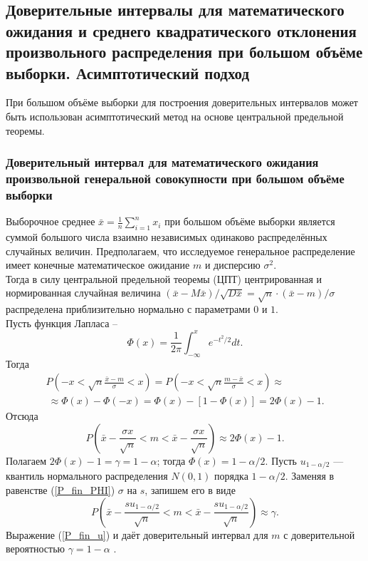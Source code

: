 \documentclass[../body.tex]{subfiles}
\begin{document}
	\subsection{Доверительные интервалы для математического ожидания и среднего квадратического отклонения произвольного распределения при большом объёме выборки. Асимптотический подход}
	При большом объёме выборки для построения доверительных интервалов может быть использован асимптотический метод на основе центральной предельной теоремы.
	\subsubsection{Доверительный интервал для математического ожидания произвольной генеральной совокупности при большом объёме выборки}
	Выборочное среднее $\bar{x} = \frac{1}{n}\sum_{i = 1}^{n}{x_{i}}$ при большом объёме выборки является суммой большого числа взаимно независимых одинаково распределённых случайных величин. Предполагаем, что исследуемое генеральное распределение имеет конечные математическое ожидание $m$ и дисперсию $\sigma^{2}$.\\ Тогда в силу центральной предельной теоремы (ЦПТ) центрированная и нормированная случайная величина $(\bar{x} - M\bar{x}) / \sqrt{D\bar{x}} = \sqrt{n}·(\bar{x}-m)/\sigma$ распределена приблизительно нормально с параметрами $0$ и $1$.\\ Пусть функция Лапласа -- 
	\begin{equation}
		\Phi(x) = \frac{1}{2\pi}\int_{-\infty}^{x}{e^{-t^{2}/2}dt}.
		\label{f_lapl}
	\end{equation} Тогда
	\begin{multline}
		P\left(-x < \sqrt{n}\frac{\bar{x} - m}{\sigma} < x \right) = 
		P\left(-x < \sqrt{n}\frac{m - \bar{x}}{\sigma} < x \right) \approx \\\
		\approx \Phi(x) - \Phi(-x)=\Phi(x) - [1 - \Phi(x)] = 2\Phi(x) - 1.
		\label{P_PHI}
	\end{multline}
	Отсюда
	\begin{equation}
		P\left(\bar{x} - \frac{\sigma x}{\sqrt{n}} < m < \bar{x} - \frac{\sigma x}{\sqrt{n}} \right) \approx 2\Phi(x) - 1.
		\label{P_fin_PHI}
	\end{equation}
	Полагаем $2\Phi(x) - 1 = \gamma = 1 - \alpha$; тогда $\Phi(x) = 1 - \alpha/2$. Пусть $u_{1-\alpha/2}$ — квантиль нормального распределения $N(0,1)$ порядка $1-\alpha/2$. Заменяя в равенстве (\ref{P_fin_PHI}) $\sigma$ на $s$, запишем его в виде
	\begin{equation}
		P\left(\bar{x} - \frac{su_{1-\alpha/2}}{\sqrt{n}} < m < \bar{x} - \frac{su_{1-\alpha/2}}{\sqrt{n}} \right) \approx \gamma.
		\label{P_fin_u}
	\end{equation}
	Выражение (\ref{P_fin_u}) и даёт доверительный интервал для $m$ с доверительной вероятностью $\gamma = 1-\alpha$ \cite[c.~460]{max}.
	
\end{document}
